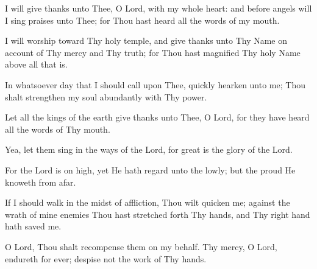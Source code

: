 I will give thanks unto Thee, O Lord, with my whole heart: and before angels will I sing praises unto Thee; for Thou hast heard all the words of my mouth.

I will worship toward Thy holy temple, and give thanks unto Thy Name on account of Thy mercy and Thy truth; for Thou hast magnified Thy holy Name above all that is.

In whatsoever day that I should call upon Thee, quickly hearken unto me; Thou shalt strengthen my soul abundantly with Thy power.

Let all the kings of the earth give thanks unto Thee, O Lord, for they have heard all the words of Thy mouth.

Yea, let them sing in the ways of the Lord, for great is the glory of the Lord.

For the Lord is on high, yet He hath regard unto the lowly; but the proud He knoweth from afar.

If I should walk in the midst of affliction, Thou wilt quicken me; against the wrath of mine enemies Thou hast stretched forth Thy hands, and Thy right hand hath saved me.

O Lord, Thou shalt recompense them on my behalf. Thy mercy, O Lord, endureth for ever; despise not the work of Thy hands.
